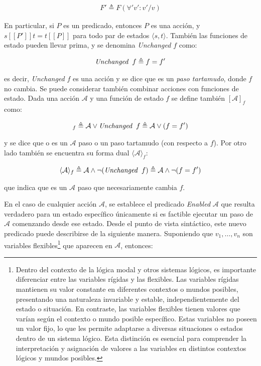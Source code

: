\begin{align}
F' \triangleq F(\forall 'v' : v' / v)
\end{align}

En particular, si $P$ es un predicado, entonces $P$ es una acción, y $s[[P']]t = t[[P]]$ para todo par de estados $\langle s,t \rangle$. También las funciones de estado pueden llevar prima, y se denomina \textit{Unchanged} $f$ como:

\begin{align}
\textit{Unchanged} \hspace{0.2cm} f \triangleq f = f'
\end{align}

es decir, \textit{Unchanged} $f$ es una acción y se dice que es un \textit{paso tartamudo}, donde $f$ no cambia. Se puede considerar también combinar acciones con funciones de estado. Dada una acción $\mathcal{A}$ y una función de estado $f$ se define también $[\mathcal{A}]_f$ como:

\begin{align}
[\mathcal{A}]_f \triangleq \mathcal{A} \lor \textit{Unchanged} \hspace{0.2cm} f \triangleq \mathcal{A} \lor (f = f')
\end{align}

y se dice que o es un $\mathcal{A}$ paso o un paso tartamudo (con respecto a $f$). Por otro lado también se encuentra su forma dual $\langle \mathcal{A} \rangle_f$:

\begin{align}
\langle\mathcal{A}\rangle_f \triangleq \mathcal{A} \land \neg(\textit{Unchanged} \hspace{0.2cm} f) \triangleq \mathcal{A} \land \neg(f = f')
\end{align}

\noindent
que indica que es un $\mathcal{A}$ paso que necesariamente cambia $f$.

En el caso de cualquier acción $\mathcal{A}$, se establece el predicado \textit{Enabled} $\mathcal{A}$ que resulta verdadero para un estado específico únicamente si es factible ejecutar un paso de $\mathcal{A}$ comenzando desde ese estado. Desde el punto de vista sintáctico, este nuevo predicado puede describirse de la siguiente manera. Suponiendo que $v_1,\ldots,v_n$ son variables flexibles\footnote{Dentro del contexto de la lógica modal y otros sistemas lógicos, es importante diferenciar entre las variables rígidas y las flexibles. Las variables rígidas mantienen su valor constante en diferentes contextos o mundos posibles, presentando una naturaleza invariable y estable, independientemente del estado o situación. En contraste, las variables flexibles tienen valores que varían según el contexto o mundo posible específico. Estas variables no poseen un valor fijo, lo que les permite adaptarse a diversas situaciones o estados dentro de un sistema lógico. Esta distinción es esencial para comprender la interpretación y asignación de valores a las variables en distintos contextos lógicos y mundos posibles.} que aparecen en $\mathcal{A}$, entonces:

